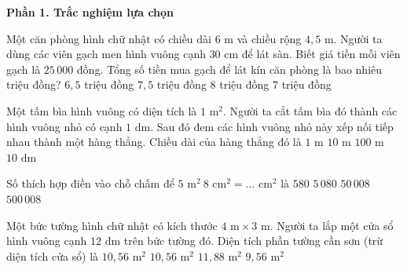 \textbf{Phần 1. Trắc nghiệm lựa chọn}

\begin{ex} %
Một căn phòng hình chữ nhật có chiều dài $6\text{ m}$ và chiều rộng $4{,}5\text{ m}$. Người ta dùng các viên gạch men hình vuông cạnh $30\text{ cm}$ để lát sàn. Biết giá tiền mỗi viên gạch là $25\,000$ đồng. Tổng số tiền mua gạch để lát kín căn phòng là bao nhiêu triệu đồng?
\choice
{$6{,}5$ triệu đồng}
{\True $7{,}5$ triệu đồng}
{$8$ triệu đồng}
{$7$ triệu đồng}
\end{ex}

\begin{ex} %
Một tấm bìa hình vuông có diện tích là $1\text{ m}^2$. Người ta cắt tấm bìa đó thành các hình vuông nhỏ có cạnh $1\text{ dm}$. Sau đó đem các hình vuông nhỏ này xếp nối tiếp nhau thành một hàng thẳng. Chiều dài của hàng thẳng đó là
\choice
{$1\text{ m}$}
{\True $10\text{ m}$}
{$100\text{ m}$}
{$10\text{ dm}$}
\end{ex}

\begin{ex} %
Số thích hợp điền vào chỗ chấm để $5\text{ m}^2\ 8\text{ cm}^2 = \dots\text{ cm}^2$ là
\choice
{$580$}
{$5\,080$}
{\True $50\,008$}
{$500\,008$}
\end{ex}

\begin{ex} %
Một bức tường hình chữ nhật có kích thước $4\text{ m} \times 3\text{ m}$. Người ta lắp một cửa sổ hình vuông cạnh $12\text{ dm}$ trên bức tường đó. Diện tích phần tường cần sơn (trừ diện tích cửa sổ) là
\choice
{$10{,}56\text{ m}^2$}
{\True $10{,}56\text{ m}^2$}
{$11{,}88\text{ m}^2$}
{$9{,}56\text{ m}^2$}
\end{ex}


